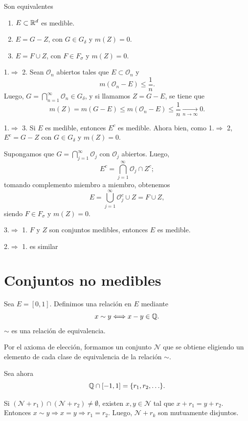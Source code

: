 \begin{teorema}{}
Son equivalentes
\begin{enumerate}
    \item $E\subset \mathbb{R}^d$ es medible.
    \item $E=G-Z$, con $G\in G_{\delta}$ y $m(Z)=0$.
    \item $E=F\cup Z$, con $F \in F_{\sigma}$ y $m(Z)=0$.
\end{enumerate}
\end{teorema}

\begin{demo}{}
1.$\Rightarrow$ 2.
Sean $\mathcal{O}_n$ abiertos tales que $E\subset \mathcal{O}_n$ y 
\[
m(\mathcal{O}_n-E)\leq \frac{1}{n}.
\]
Luego, $G=\bigcap\limits_{n=1}^{\infty} \mathcal{O}_n \in G_{\delta}$, 
y si llamamos $Z=G-E$, se tiene que 
\[m(Z)=
m(G-E)\leq m(\mathcal{O}_n-E)\leq \frac{1}{n}\xrightarrow[n \to \infty]{}0.
\]

1.$\Rightarrow$ 3.
Si $E$ es medible, entonces $E^c$ es medible. Ahora bien, como 1.$\Rightarrow$ 2, $E^c=G-Z$ con $G \in G_{\delta}$  y $m(Z)=0$. 

Supongamos que $G=\bigcap\limits_{j=1}^{\infty} \mathcal{O}_j$ 
con $\mathcal{O}_j$ abiertos.
Luego, 
\[E^c=\bigcap\limits_{j=1}^{\infty} \mathcal{O}_j \cap Z^c;
\]
tomando complemento miembro a miembro, obtenemos
\[
E=\bigcup\limits_{j=1}^{\infty} \mathcal{O}_j^c \cup Z=F\cup Z,
\]
siendo $F \in F_{\sigma}$ y $m(Z)=0$.

3.$\Rightarrow$ 1. $F$ y $Z$ son conjuntos medibles, entonces $E$ es medible.

2.$\Rightarrow$ 1. es similar

\end{demo}


\section{Conjuntos no medibles}

Sea $E=[0,1]$. 
Definimos una relaci\'on en $E$ mediante
\[
x \sim y \Longleftrightarrow  x-y\in \mathbb{Q}.
\]
$\sim$ es una relaci\'on de equivalencia.

Por el axioma de elecci\'on, formamos un  conjunto $\mathcal{N}$ que se obtiene eligiendo  un elemento de cada clase de equivalencia de la relaci\'on $\sim$.

Sea ahora 
\[
\mathbb{Q} \cap [-1,1] 
=\{r_1,r_2,\ldots \}.
\] 

Si $(\mathcal{N}+r_1)\cap (\mathcal{N}+r_2)\neq \emptyset$, 
existen $x,y\in \mathcal{N}$ tal que $x+r_1=y+r_2$. Entonces 
$x \sim y \Rightarrow x=y \Rightarrow r_1=r_2$.
Luego, $\mathcal{N}+r_k$ son mutuamente disjuntos.

